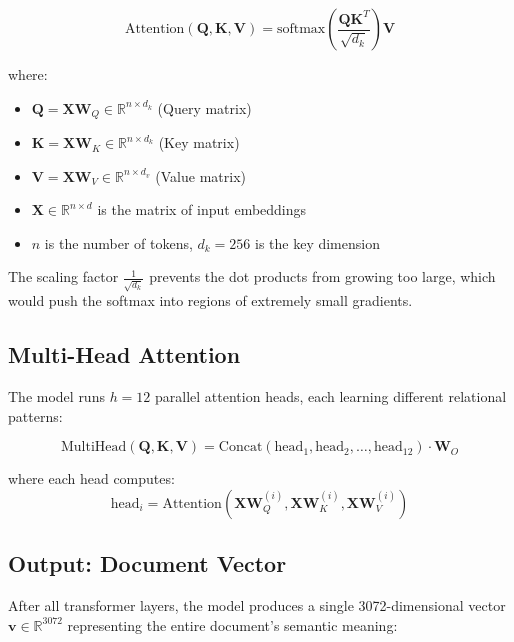 \begin{equation}
\boxed{\text{Attention}(\mathbf{Q}, \mathbf{K}, \mathbf{V}) = \text{softmax}\left(\frac{\mathbf{Q}\mathbf{K}^T}{\sqrt{d_k}}\right) \mathbf{V}}
\label{eq:attention}
\end{equation}

where:
\begin{itemize}
    \item $\mathbf{Q} = \mathbf{X}\mathbf{W}_Q \in \mathbb{R}^{n \times d_k}$ (Query matrix)
    \item $\mathbf{K} = \mathbf{X}\mathbf{W}_K \in \mathbb{R}^{n \times d_k}$ (Key matrix)
    \item $\mathbf{V} = \mathbf{X}\mathbf{W}_V \in \mathbb{R}^{n \times d_v}$ (Value matrix)
    \item $\mathbf{X} \in \mathbb{R}^{n \times d}$ is the matrix of input embeddings
    \item $n$ is the number of tokens, $d_k = 256$ is the key dimension
\end{itemize}

The scaling factor $\frac{1}{\sqrt{d_k}}$ prevents the dot products from growing too large, which would push the softmax into regions of extremely small gradients.

\subsection{Multi-Head Attention}

The model runs $h = 12$ parallel attention heads, each learning different relational patterns:

\begin{equation}
\text{MultiHead}(\mathbf{Q}, \mathbf{K}, \mathbf{V}) = \text{Concat}(\text{head}_1, \text{head}_2, \ldots, \text{head}_{12}) \cdot \mathbf{W}_O
\end{equation}

where each head computes:
\begin{equation}
\text{head}_i = \text{Attention}(\mathbf{X}\mathbf{W}_Q^{(i)}, \mathbf{X}\mathbf{W}_K^{(i)}, \mathbf{X}\mathbf{W}_V^{(i)})
\end{equation}

\subsection{Output: Document Vector}

After all transformer layers, the model produces a single 3072-dimensional vector $\mathbf{v} \in \mathbb{R}^{3072}$ representing the entire document's semantic meaning:

